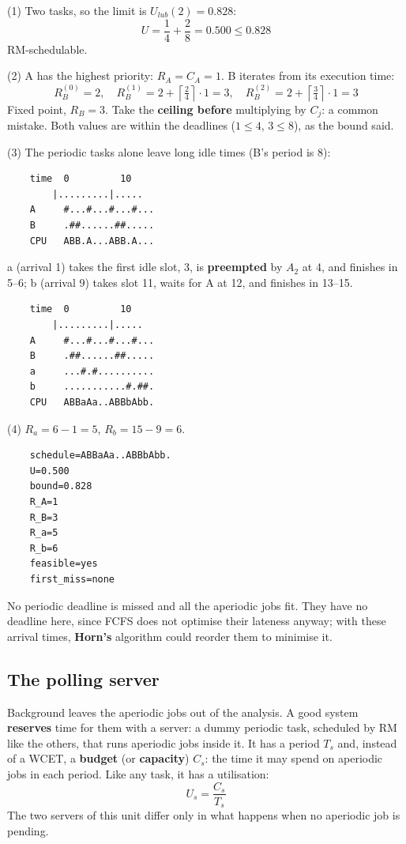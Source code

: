 (1) Two tasks, so the limit is $U_{lub}(2) = 0.828$:
\[
U = \frac{1}{4} + \frac{2}{8} = 0.500 \le 0.828
\]
RM-schedulable.

(2) A has the highest priority: $R_A = C_A = 1$. B iterates from its execution time:
\[
R_B^{(0)} = 2, \quad R_B^{(1)} = 2 + \left\lceil \tfrac{2}{4} \right\rceil \cdot 1 = 3, \quad R_B^{(2)} = 2 + \left\lceil \tfrac{3}{4} \right\rceil \cdot 1 = 3
\]
Fixed point, $R_B = 3$. Take the \textbf{ceiling before} multiplying by $C_j$: a common mistake. Both values are within the deadlines ($1 \le 4$, $3 \le 8$), as the bound said.

(3) The periodic tasks alone leave long idle times (B's period is 8):
\begin{verbatim}
    time  0         10
        |.........|.....
    A     #...#...#...#...
    B     .##......##.....
    CPU   ABB.A...ABB.A...
\end{verbatim}
a (arrival 1) takes the first idle slot, 3, is \textbf{preempted} by $A_2$ at 4, and finishes in 5--6; b (arrival 9) takes slot 11, waits for A at 12, and finishes in 13--15.
\begin{verbatim}
    time  0         10
        |.........|.....
    A     #...#...#...#...
    B     .##......##.....
    a     ...#.#..........
    b     ...........#.##.
    CPU   ABBaAa..ABBbAbb.
\end{verbatim}
(4) $R_a = 6 - 1 = 5$, \quad $R_b = 15 - 9 = 6$.
\begin{verbatim}
    schedule=ABBaAa..ABBbAbb.
    U=0.500
    bound=0.828
    R_A=1
    R_B=3
    R_a=5
    R_b=6
    feasible=yes
    first_miss=none
\end{verbatim}
No periodic deadline is missed and all the aperiodic jobs fit. They have no deadline here, since FCFS does not optimise their lateness anyway; with these arrival times, \textbf{Horn's} algorithm could reorder them to minimise it.

\subsection{The polling server}
Background leaves the aperiodic jobs out of the analysis. A good system \textbf{reserves} time for them with a server: a dummy periodic task, scheduled by RM like the others, that runs aperiodic jobs inside it. It has a period $T_s$ and, instead of a WCET, a \textbf{budget} (or \textbf{capacity}) $C_s$: the time it may spend on aperiodic jobs in each period. Like any task, it has a utilisation:
\[
U_s = \frac{C_s}{T_s}
\]
The two servers of this unit differ only in what happens when no aperiodic job is pending.

